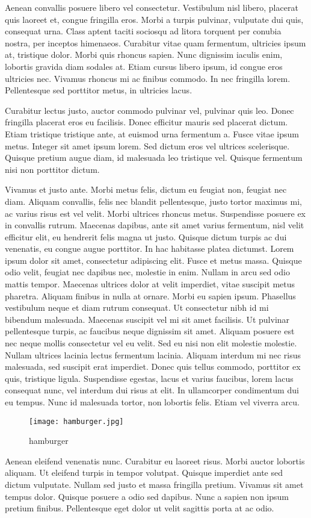 \documentclass[12pt,a4paper]{article}
\begin{document}
Aenean convallis posuere libero vel consectetur. Vestibulum nisl libero, placerat quis laoreet et, congue fringilla eros. Morbi a turpis pulvinar, vulputate dui quis, consequat urna. Class aptent taciti sociosqu ad litora torquent per conubia nostra, per inceptos himenaeos. Curabitur vitae quam fermentum, ultricies ipsum at, tristique dolor. Morbi quis rhoncus sapien. Nunc dignissim iaculis enim, lobortis gravida diam sodales at. Etiam cursus libero ipsum, id congue eros ultricies nec. Vivamus rhoncus mi ac finibus commodo. In nec fringilla lorem. Pellentesque sed porttitor metus, in ultricies lacus.

Curabitur lectus justo, auctor commodo pulvinar vel, pulvinar quis leo. Donec fringilla placerat eros eu facilisis. Donec efficitur mauris sed placerat dictum. Etiam tristique tristique ante, at euismod urna fermentum a. Fusce vitae ipsum metus. Integer sit amet ipsum lorem. Sed dictum eros vel ultrices scelerisque. Quisque pretium augue diam, id malesuada leo tristique vel. Quisque fermentum nisi non porttitor dictum.

Vivamus et justo ante. Morbi metus felis, dictum eu feugiat non, feugiat nec diam. Aliquam convallis, felis nec blandit pellentesque, justo tortor maximus mi, ac varius risus est vel velit. Morbi ultrices rhoncus metus. Suspendisse posuere ex in convallis rutrum. Maecenas dapibus, ante sit amet varius fermentum, nisl velit efficitur elit, eu hendrerit felis magna ut justo. Quisque dictum turpis ac dui venenatis, eu congue augue porttitor. In hac habitasse platea dictumst. Lorem ipsum dolor sit amet, consectetur adipiscing elit. Fusce et metus massa. Quisque odio velit, feugiat nec dapibus nec, molestie in enim. Nullam in arcu sed odio mattis tempor. Maecenas ultrices dolor at velit imperdiet, vitae suscipit metus pharetra. Aliquam finibus in nulla at ornare.
Morbi eu sapien ipsum. Phasellus vestibulum neque et diam rutrum consequat. Ut consectetur nibh id mi bibendum malesuada. Maecenas suscipit vel mi sit amet facilisis. Ut pulvinar pellentesque turpis, ac faucibus neque dignissim sit amet. Aliquam posuere est nec neque mollis consectetur vel eu velit. Sed eu nisi non elit molestie molestie. Nullam ultrices lacinia lectus fermentum lacinia. Aliquam interdum mi nec risus malesuada, sed suscipit erat imperdiet. Donec quis tellus commodo, porttitor ex quis, tristique ligula. Suspendisse egestas, lacus et varius faucibus, lorem lacus consequat nunc, vel interdum dui risus at elit. In ullamcorper condimentum dui eu tempus. Nunc id malesuada tortor, non lobortis felis. Etiam vel viverra arcu.
	\begin{figure}[H]
		\centering
		\texttt{[image: hamburger.jpg]}
		\caption{hamburger}
	\end{figure}
 \label{hamburger}
Aenean eleifend venenatis nunc. Curabitur eu laoreet risus. Morbi auctor lobortis aliquam. Ut eleifend turpis in tempor volutpat. Quisque imperdiet ante sed dictum vulputate. Nullam sed justo et massa fringilla pretium. Vivamus sit amet tempus dolor. Quisque posuere a odio sed dapibus. Nunc a sapien non ipsum pretium finibus. Pellentesque eget dolor ut velit sagittis porta at ac odio.
\end{document}
